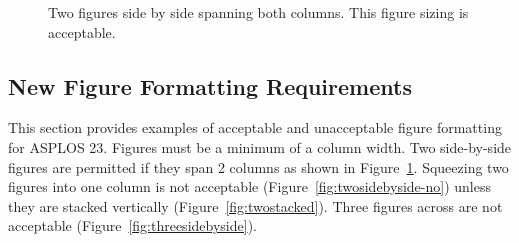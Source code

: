 \documentclass[pageno]{jpaper}
\begin{document}
\begin{figure}[t!bhp]%
    \centering

    \caption{Two figures side by side spanning both columns. This figure sizing is acceptable.}%
    \label{fig:twosidebyside-ok}%

\end{figure}

\subsection{New Figure Formatting Requirements}

This section provides examples of acceptable and unacceptable figure formatting for ASPLOS 23. Figures must be a minimum of a column width. Two side-by-side figures are permitted if they span 2 columns as shown in Figure~\ref{fig:twosidebyside-ok}. Squeezing two figures into one column is not acceptable (Figure~\ref{fig:twosidebyside-no}) unless they are stacked vertically (Figure~\ref{fig:twostacked}). Three figures across are not acceptable (Figure~\ref{fig:threesidebyside}). 
\end{document}
